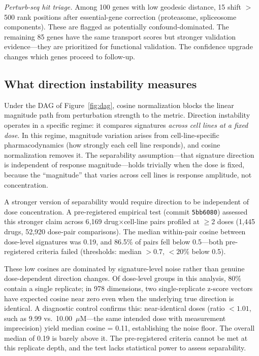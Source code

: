 \documentclass[11pt]{article}
\begin{document}
\emph{Perturb-seq hit triage.} Among 100 genes with low geodesic
distance, 15 shift $>$500 rank positions after essential-gene correction
(proteasome, spliceosome components). These are flagged as potentially
confound-dominated. The remaining 85 genes have the same transport
scores but stronger validation evidence---they are prioritized for functional
validation. The confidence upgrade changes which genes proceed to follow-up.

\subsection{What direction instability measures}

Under the DAG of Figure~\ref{fig:dag}, cosine normalization blocks the
linear magnitude path from perturbation strength to the metric. Direction
instability operates in a specific regime: it compares signatures
\emph{across cell lines at a fixed dose}. In this regime, magnitude
variation arises from cell-line-specific pharmacodynamics (how strongly
each cell line responds), and cosine normalization removes it. The
separability assumption---that signature direction is independent of
response magnitude---holds trivially when the dose is fixed, because
the ``magnitude'' that varies across cell lines is response amplitude,
not concentration.

A stronger version of separability would require direction to be
independent of dose concentration. A pre-registered empirical test
(commit \texttt{5bb6080}) assessed this stronger claim across 6{,}169
drug$\times$cell-line pairs profiled at $\geq$2 doses (1{,}445 drugs,
52{,}920 dose-pair comparisons). The median within-pair cosine between
dose-level signatures was 0.19, and 86.5\% of pairs fell below
0.5---both pre-registered criteria failed (thresholds: median $> 0.7$,
$< 20\%$ below 0.5).

These low cosines are dominated by signature-level noise rather than
genuine dose-dependent direction changes. Of dose-level groups in this
analysis, 80\% contain a single replicate; in 978 dimensions, two
single-replicate z-score vectors have expected cosine near zero even
when the underlying true direction is identical. A diagnostic control
confirms this: near-identical doses (ratio $< 1.01$, such as 9.99 vs.\
10.00~$\mu$M---the same intended dose with measurement imprecision)
yield median cosine = 0.11, establishing the noise floor. The overall
median of 0.19 is barely above it. The pre-registered criteria cannot
be met at this replicate depth, and the test lacks statistical power
to assess separability.
\end{document}
